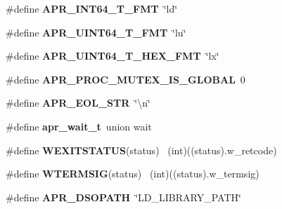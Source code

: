 \begin{DoxyCompactItemize}
\item 
\#define {\bfseries A\+P\+R\+\_\+\+I\+N\+T64\+\_\+\+T\+\_\+\+F\+MT}~\char`\"{}ld\char`\"{}\hypertarget{group__apr__platform_ga41cc6dfe3d69cd66cffc8aae4b59bd08}{}\label{group__apr__platform_ga41cc6dfe3d69cd66cffc8aae4b59bd08}

\item 
\#define {\bfseries A\+P\+R\+\_\+\+U\+I\+N\+T64\+\_\+\+T\+\_\+\+F\+MT}~\char`\"{}lu\char`\"{}\hypertarget{group__apr__platform_ga7fc21e56e167a47d7478600dee7ab502}{}\label{group__apr__platform_ga7fc21e56e167a47d7478600dee7ab502}

\item 
\#define {\bfseries A\+P\+R\+\_\+\+U\+I\+N\+T64\+\_\+\+T\+\_\+\+H\+E\+X\+\_\+\+F\+MT}~\char`\"{}lx\char`\"{}\hypertarget{group__apr__platform_ga528bc9f3c6f3500b35e97c4b25566b48}{}\label{group__apr__platform_ga528bc9f3c6f3500b35e97c4b25566b48}

\item 
\#define {\bfseries A\+P\+R\+\_\+\+P\+R\+O\+C\+\_\+\+M\+U\+T\+E\+X\+\_\+\+I\+S\+\_\+\+G\+L\+O\+B\+AL}~0\hypertarget{group__apr__platform_ga90ebe3e3537fdff1e66c6baf4b560de8}{}\label{group__apr__platform_ga90ebe3e3537fdff1e66c6baf4b560de8}

\item 
\#define {\bfseries A\+P\+R\+\_\+\+E\+O\+L\+\_\+\+S\+TR}~\char`\"{}\textbackslash{}n\char`\"{}\hypertarget{group__apr__platform_ga20953ff75ca59692aac949acfdaa25f6}{}\label{group__apr__platform_ga20953ff75ca59692aac949acfdaa25f6}

\item 
\#define {\bfseries apr\+\_\+wait\+\_\+t}~union wait\hypertarget{group__apr__platform_ga13fae72fec73474a6b35ed86b9104bf5}{}\label{group__apr__platform_ga13fae72fec73474a6b35ed86b9104bf5}

\item 
\#define {\bfseries W\+E\+X\+I\+T\+S\+T\+A\+T\+US}(status)    ~(int)((status).w\+\_\+retcode)\hypertarget{group__apr__platform_ga1f868e3b6a6d312e9488a29c15a4479a}{}\label{group__apr__platform_ga1f868e3b6a6d312e9488a29c15a4479a}

\item 
\#define {\bfseries W\+T\+E\+R\+M\+S\+IG}(status)          ~(int)((status).w\+\_\+termsig)\hypertarget{group__apr__platform_ga5306079cab2308bb36a450adfa70363c}{}\label{group__apr__platform_ga5306079cab2308bb36a450adfa70363c}

\item 
\#define {\bfseries A\+P\+R\+\_\+\+D\+S\+O\+P\+A\+TH}~\char`\"{}L\+D\+\_\+\+L\+I\+B\+R\+A\+R\+Y\+\_\+\+P\+A\+TH\char`\"{}\hypertarget{group__apr__platform_ga2eb8121bd28ad578c3cbca3a68f6d823}{}\label{group__apr__platform_ga2eb8121bd28ad578c3cbca3a68f6d823}

\end{DoxyCompactItemize}
